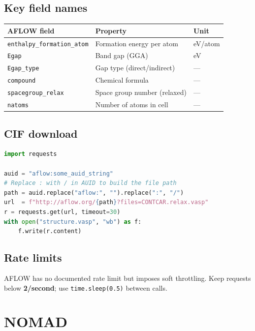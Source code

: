 \documentclass[11pt,a4paper]{article}
\begin{document}
\subsection{Key field names}
\begin{center}
\begin{tabular}{lll}
\toprule
AFLOW field & Property & Unit \\
\midrule
\texttt{enthalpy\_formation\_atom} & Formation energy per atom & eV/atom \\
\texttt{Egap}                      & Band gap (GGA)            & eV \\
\texttt{Egap\_type}                & Gap type (direct/indirect) & --- \\
\texttt{compound}                  & Chemical formula           & --- \\
\texttt{spacegroup\_relax}         & Space group number (relaxed) & --- \\
\texttt{natoms}                    & Number of atoms in cell    & --- \\
\bottomrule
\end{tabular}
\end{center}

\subsection{CIF download}
\begin{lstlisting}[language=Python]
import requests

auid = "aflow:some_auid_string"
# Replace : with / in AUID to build the file path
path = auid.replace("aflow:", "").replace(":", "/")
url  = f"http://aflow.org/{path}?files=CONTCAR.relax.vasp"
r = requests.get(url, timeout=30)
with open("structure.vasp", "wb") as f:
    f.write(r.content)
\end{lstlisting}

\subsection{Rate limits}
AFLOW has no documented rate limit but imposes soft throttling.
Keep requests below \textbf{2/second}; use \verb|time.sleep(0.5)| between calls.

\section{NOMAD}
\end{document}
